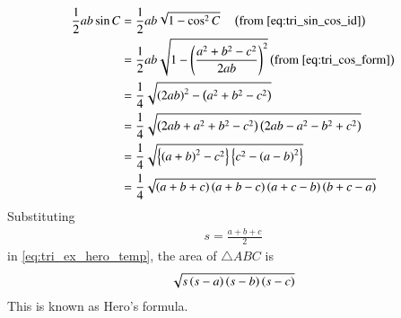 \begin{enumerate}[label=\arabic*.,ref=\thesubsection.\theenumi]
{\begin{align}
\label{eq:tri_geo_area_sin_form}
 \frac{1}{2}ab\sin C
&=\frac{1}{2}ab\sqrt{1-\cos^2C} 
\quad \left(\text{from } \eqref{eq:tri_sin_cos_id}
\right)
\\
&=\frac{1}{2}ab\sqrt{1-\left(\frac{a^2+b^2-c^2}{2ab}\right)^2} \left(\text{from } \eqref{eq:tri_cos_form}
\right)
\\
&=\frac{1}{4}\sqrt{\left(2ab\right)^2-\left(a^2+b^2-c^2\right)}
\\
&=\frac{1}{4}\sqrt{\left(2ab+a^2+b^2-c^2\right)\left(2ab-a^2-b^2+c^2\right)}
\\
&= \frac{1}{4}\sqrt{\left\{\left(a+b\right)^2-c^2\right\}\left\{c^2-\left(a-b\right)^2\right\}}
\\
&= \frac{1}{4}\sqrt{\left(a+b+c\right)\left(a+b-c\right)\left(a+c-b\right)\left(b+c-a\right)}
\label{eq:tri_ex_hero_temp}
\end{align}
}
Substituting 
%
\begin{align}
s=\frac{a+b+c}{2}
\end{align}
%
in \eqref{eq:tri_ex_hero_temp}, the area of $\triangle ABC$ is 
%
\begin{align}
\label{eq:tri_hero}
\sqrt{s\left(s-a\right)\left(s-b\right)\left(s-c\right)}
\end{align}
%
This is known as Hero's formula.
\end{enumerate}



